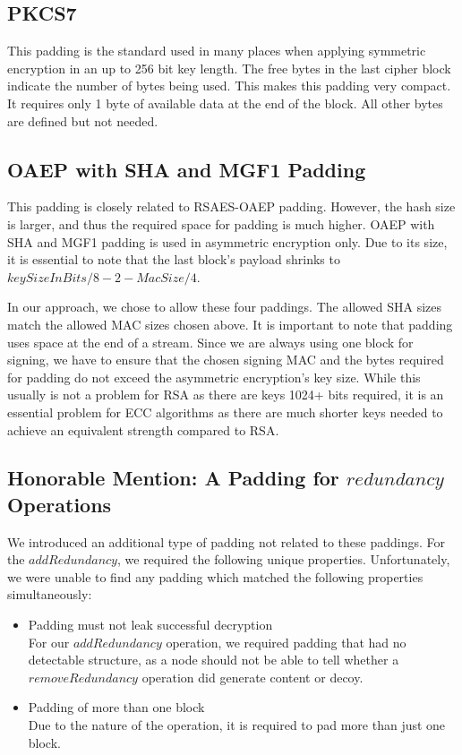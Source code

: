 \subsection{PKCS7} 
This padding is the standard used in many places when applying symmetric encryption in an up to 256 bit key length. The free bytes in the last cipher block indicate the number of bytes being used. This makes this padding very compact. It requires only 1 byte of available data at the end of the block. All other bytes are defined but not needed.

\subsection{OAEP with SHA and MGF1 Padding} 
This padding is closely related to RSAES-OAEP padding. However, the hash size is larger, and thus the required space for padding is much higher. OAEP with SHA and MGF1 padding is used in asymmetric encryption only. Due to its size, it is essential to note that the last block's payload shrinks to $keySizeInBits/8-2-MacSize/4$.

In our approach, we chose to allow these four paddings. The allowed SHA sizes match the allowed MAC sizes chosen above. It is important to note that padding uses space at the end of a stream. Since we are always using one block for signing, we have to ensure that the chosen signing MAC and the bytes required for padding do not exceed the asymmetric encryption's key size. While this usually is not a problem for RSA as there are keys 1024+ bits required, it is an essential problem for ECC algorithms as there are much shorter keys needed to achieve an equivalent strength compared to RSA. 

\subsection{Honorable Mention: A Padding for \texorpdfstring{$redundancy$}{redundancy} Operations}
We introduced an additional type of padding not related to these paddings. For the $addRedundancy$, we required the following unique properties. Unfortunately, we were unable to find any padding which matched the following properties simultaneously:

\begin{itemize}
	\item Padding must not leak successful decryption\\
	For our $addRedundancy$ operation, we required padding that had no detectable structure, as a node should not be able to tell whether a $removeRedundancy$ operation did generate content or decoy. 
	\item Padding of more than one block\\
	Due to the nature of the operation, it is required to pad more than just one block.
\end{itemize}

